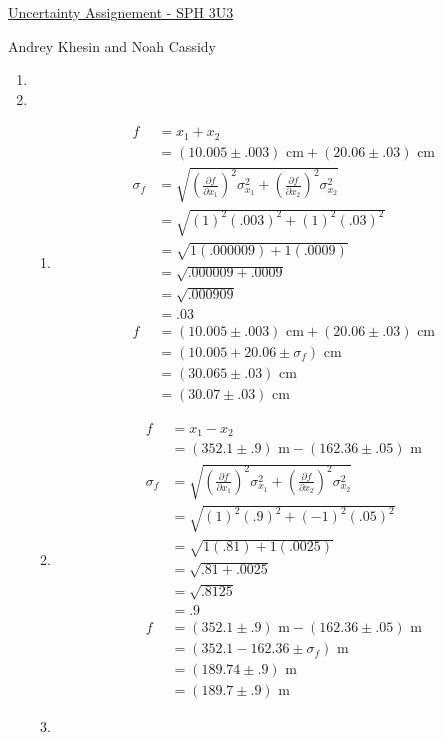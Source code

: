 \documentclass{article}
\begin{document}
\centerline{\sc \large \underline{Uncertainty Assignement - SPH 3U3}}
\centerline{\sc Andrey Khesin and Noah Cassidy}
\centerline{}

\begin{enumerate}
\item 
\item
\begin{enumerate}
\item
\begin{align*}
f &= x_{1} + x_{2}\\
&= (10.005 \pm .003)\text{ cm} + (20.06 \pm .03)\text{ cm}\\
\sigma_{f} &= \sqrt{(\frac{\partial f}{\partial x_{1}})^2\sigma_{x_{1}}^2 + (\frac{\partial f}{\partial x_{2}})^2\sigma_{x_{2}}^2}\\
&= \sqrt{(1)^2(.003)^2 + (1)^2(.03)^2}\\
&= \sqrt{1(.000009) + 1(.0009)}\\
&= \sqrt{.000009 + .0009}\\
&= \sqrt{.000909}\\
&= .03\\
f &= (10.005 \pm .003)\text{ cm} + (20.06 \pm .03)\text{ cm}\\
&= (10.005 + 20.06 \pm \sigma_{f})\text{ cm}\\
&= (30.065 \pm .03)\text{ cm}\\
&= (30.07 \pm .03)\text{ cm}
\end{align*}
\item
\begin{align*}
f &= x_{1} - x_{2}\\
&= (352.1 \pm .9)\text{ m} - (162.36 \pm .05)\text{ m}\\
\sigma_{f} &= \sqrt{(\frac{\partial f}{\partial x_{1}})^2\sigma_{x_{1}}^2 + (\frac{\partial f}{\partial x_{2}})^2\sigma_{x_{2}}^2}\\
&= \sqrt{(1)^2(.9)^2 + (-1)^2(.05)^2}\\
&= \sqrt{1(.81) + 1(.0025)}\\
&= \sqrt{.81 + .0025}\\
&= \sqrt{.8125}\\
&= .9\\
f &= (352.1 \pm .9)\text{ m} - (162.36 \pm .05)\text{ m}\\
&= (352.1 - 162.36 \pm \sigma_{f})\text{ m}\\
&= (189.74 \pm .9)\text{ m}\\
&= (189.7 \pm .9)\text{ m}
\end{align*}
\item

\end{enumerate}
\end{enumerate}
\end{document}

